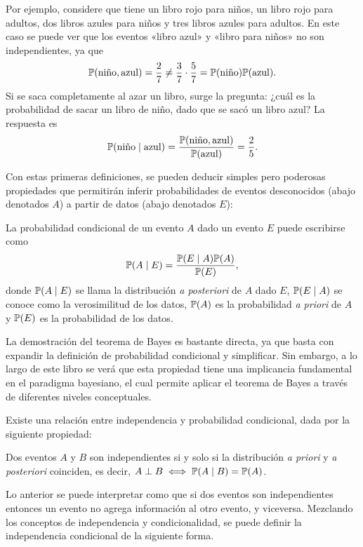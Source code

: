 Por ejemplo, considere que tiene un libro rojo para niños, un libro rojo para adultos, dos libros azules para niños y tres libros azules para adultos. En este caso se puede ver que los eventos «libro azul» y «libro para niños» no son independientes, ya que
\[\mathbb{P}(\textrm{niño}, \mathrm{azul}) = \frac{2}{7} \neq \frac{3}{7} \cdot \frac{5}{7} = \mathbb{P}(\textrm{niño}) \mathbb{P}(\textrm{azul}).\]
Si se saca completamente al azar un libro, surge la pregunta: ¿cuál es la probabilidad de sacar un libro de niño, dado que se sacó un libro azul? La respuesta es
\[\mathbb{P}(\textrm{niño} \mid \textrm{azul}) = \frac{\mathbb{P}(\textrm{niño}, \textrm{azul})}{\mathbb{P}(\textrm{azul})} = \frac{2}{5}.\]

Con estas primeras definiciones, se pueden deducir simples pero poderosas propiedades que permitirán inferir probabilidades de eventos desconocidos (abajo denotados \(A\)) a partir de datos (abajo denotados \(E\)):

\begin{theorem}
	La probabilidad condicional de un evento \(A\) dado un evento \(E\) puede escribirse como
	\[\mathbb{P}(A \mid E) = \frac{\mathbb{P}(E \mid A) \mathbb{P}(A)}{\mathbb{P}(E)},\]
	donde \(\mathbb{P}(A \mid E)\) se llama la distribución \emph{a posteriori} de \(A\) dado \(E\), \(\mathbb{P}(E \mid A)\) se conoce como la verosimilitud de los datos, \(\mathbb{P}(A)\) es la probabilidad \emph{a priori} de \(A\) y \(\mathbb{P}(E)\) es la probabilidad de los datos.
\end{theorem}

La demostración del teorema de Bayes es bastante directa, ya que basta con expandir la definición de probabilidad condicional y simplificar. Sin embargo, a lo largo de este libro se verá que esta propiedad tiene una implicancia fundamental en el paradigma bayesiano, el cual permite aplicar el teorema de Bayes a través de diferentes niveles conceptuales.

Existe una relación entre independencia y probabilidad condicional, dada por la siguiente propiedad:
\begin{proposition}
	Dos eventos \(A\) y \(B\) son independientes si y solo si la distribución \emph{a priori} y \emph{a posteriori} coinciden, es decir, \(A \perp B \iff \mathbb{P}(A \mid B) = \mathbb{P}(A)\).
\end{proposition}
Lo anterior se puede interpretar como que si dos eventos son independientes entonces un evento no agrega información al otro evento, y viceversa. Mezclando los conceptos de independencia y condicionalidad, se puede definir la independencia condicional de la siguiente forma.

